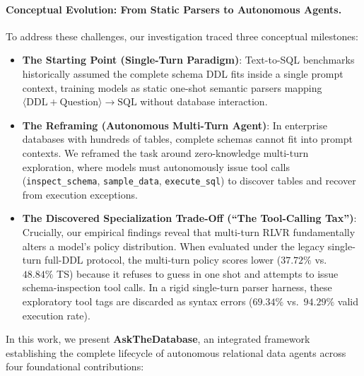 \documentclass{article}
\theoremstyle{plain}
\theoremstyle{definition}
\theoremstyle{remark}
\begin{document}
\paragraph{Conceptual Evolution: From Static Parsers to Autonomous Agents.}
To address these challenges, our investigation traced three conceptual milestones:
\begin{itemize}[leftmargin=*,itemsep=2pt]
    \item \textbf{The Starting Point (Single-Turn Paradigm)}: Text-to-SQL benchmarks historically assumed the complete schema DDL fits inside a single prompt context, training models as static one-shot semantic parsers mapping $\langle \text{DDL} + \text{Question} \rangle \to \text{SQL}$ without database interaction.
    \item \textbf{The Reframing (Autonomous Multi-Turn Agent)}: In enterprise databases with hundreds of tables, complete schemas cannot fit into prompt contexts. We reframed the task around zero-knowledge multi-turn exploration, where models must autonomously issue tool calls (\texttt{inspect\_schema}, \texttt{sample\_data}, \texttt{execute\_sql}) to discover tables and recover from execution exceptions.
    \item \textbf{The Discovered Specialization Trade-Off (``The Tool-Calling Tax'')}: Crucially, our empirical findings reveal that multi-turn RLVR fundamentally alters a model's policy distribution. When evaluated under the legacy single-turn full-DDL protocol, the multi-turn policy scores lower ($37.72\%$ vs.\ $48.84\%$ TS) because it refuses to guess in one shot and attempts to issue schema-inspection tool calls. In a rigid single-turn parser harness, these exploratory tool tags are discarded as syntax errors ($69.34\%$ vs.\ $94.29\%$ valid execution rate).
\end{itemize}

In this work, we present \textbf{AskTheDatabase}, an integrated framework establishing the complete lifecycle of autonomous relational data agents across four foundational contributions:
\end{document}
